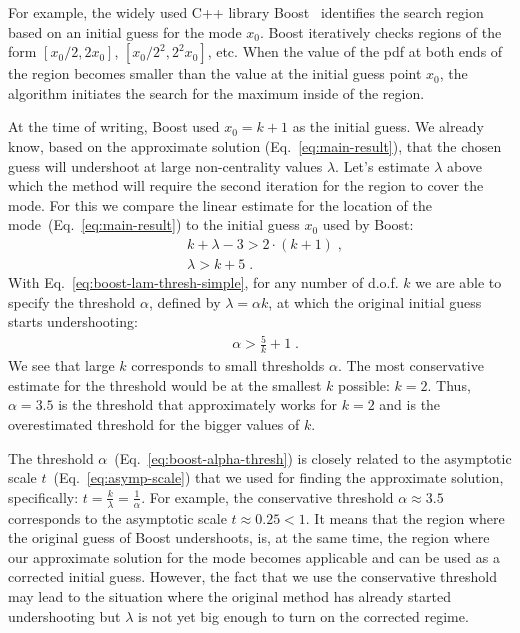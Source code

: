 \documentclass{amsart}
\numberwithin{equation}{section}
\begin{document}
For example, the widely used C++ library Boost~\cite{boost} identifies the search region based on an initial guess for the mode $x_0$. Boost iteratively checks regions of the form $[x_0/2, 2x_0]$,  $[x_0/2^2, 2^2x_0]$, etc. When the value of the pdf at both ends of the region becomes smaller than the value at the initial guess point $x_0$, the algorithm initiates the search for the maximum inside of the region.

At the time of writing, Boost used $x_0 = k + 1$ as the initial guess. We already know, based on the approximate solution (Eq.~\ref{eq:main-result}), that the chosen guess will undershoot at large non-centrality values $\lambda$. Let's estimate $\lambda$ above which the method will require the second iteration for the region to cover the mode. For this we compare the linear estimate for the location of the mode~(Eq.~\ref{eq:main-result}) to the initial guess $x_0$ used by Boost:
%
\begin{align}
    &k + \lambda - 3 > 2 \cdot (k + 1)\;, \\
    &\lambda > k + 5 \label{eq:boost-lam-thresh-simple}\;.
\end{align}
%
With Eq.~\ref{eq:boost-lam-thresh-simple}, for any number of d.o.f. $k$ we are able to specify the threshold $\alpha$, defined by $\lambda  = \alpha k$, at which the original initial guess starts undershooting:
%
\begin{align}
    &\alpha > \frac{5}{k} + 1 \label{eq:boost-alpha-thresh}\;.
\end{align}
%
We see that large $k$ corresponds to small thresholds $\alpha$. The most conservative estimate for the threshold would be at the smallest $k$ possible: $k = 2$. Thus, $\alpha = 3.5$ is the threshold that approximately works for $k=2$ and is the overestimated threshold for the bigger values of $k$.

The threshold $\alpha$~(Eq.~\ref{eq:boost-alpha-thresh}) is closely related to the asymptotic scale $t$~(Eq.~\ref{eq:asymp-scale}) that we used for finding the approximate solution, specifically: $t = \frac{k}{\lambda} = \frac{1}{\alpha}$. For example, the conservative threshold $\alpha \approx 3.5$ corresponds to the asymptotic scale $t \approx 0.25 < 1$. It means that the region where the original guess of Boost undershoots, is, at the same time, the region where our approximate solution for the mode becomes applicable and can be used as a corrected initial guess. However, the fact that we use the conservative threshold may lead to the situation where the original method has already started undershooting but $\lambda$ is not yet big enough to turn on the corrected regime.
\end{document}
